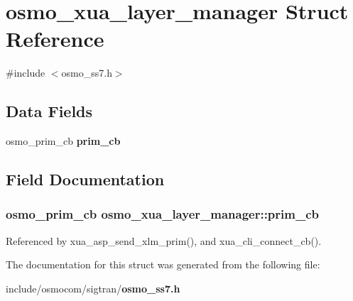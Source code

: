 \section{osmo\+\_\+xua\+\_\+layer\+\_\+manager Struct Reference}
\label{structosmo__xua__layer__manager}


{\ttfamily \#include $<$osmo\+\_\+ss7.\+h$>$}

\subsection*{Data Fields}
\begin{DoxyCompactItemize}
\item 
osmo\+\_\+prim\+\_\+cb {\bf prim\+\_\+cb}
\end{DoxyCompactItemize}


\subsection{Field Documentation}
\subsubsection[{prim\+\_\+cb}]{\setlength{\rightskip}{0pt plus 5cm}osmo\+\_\+prim\+\_\+cb osmo\+\_\+xua\+\_\+layer\+\_\+manager\+::prim\+\_\+cb}\label{structosmo__xua__layer__manager_a0691ce08a9d0b315635388e5dcc0c6e0}


Referenced by xua\+\_\+asp\+\_\+send\+\_\+xlm\+\_\+prim(), and xua\+\_\+cli\+\_\+connect\+\_\+cb().



The documentation for this struct was generated from the following file\+:\begin{DoxyCompactItemize}
\item 
include/osmocom/sigtran/{\bf osmo\+\_\+ss7.\+h}\end{DoxyCompactItemize}
